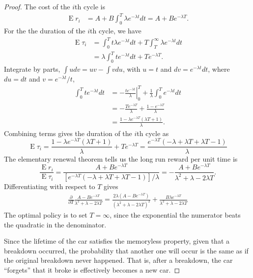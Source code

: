 \documentclass[oneside]{amsart}
\DeclareMathOperator{\E}{\mathrm{E}}
\theoremstyle{definition}
\begin{document}
\begin{proof}
The cost of the $i$th cycle is 
\begin{align*}
	\E r_i &= A + B  \int_0^T \lambda e^{-\lambda t} dt = A + B e^{-\lambda T}.
\end{align*}
For the the duration of the $i$th cycle, we have
\begin{align*}
	\E \tau_i &= \int_0^T t \lambda e^{-\lambda t}dt  + T \int_T^\infty \lambda e^{-\lambda t}dt \\
	&= \lambda \int_0^T t  e^{-\lambda t}dt +  T e^{-\lambda T}. 
\end{align*}
Integrate by parts, $\int  u  dv = uv- \int vdu$, with $u=t$ and $dv=e^{-\lambda t}dt$, where $du = dt$ and $v = e^{-\lambda t}/t$,
\begin{align*}
\int_0^T t e^{-\lambda t}dt  &= \left.-\frac{t e^{-\lambda t}}{\lambda} \right|_0^T + \frac{1}{\lambda} \int_0^Te^{-\lambda t}dt  \\ 
	&=-\frac{T e^{-\lambda T}}{\lambda} + \frac{1-e^{-\lambda T}}{\lambda} \\
	&= \frac{1-\lambda  e^{-\lambda T}(\lambda T + 1)}{\lambda}.
\end{align*}
Combining terms gives the duration of the $i$th cycle as
\[
	\E \tau_i =  \frac{1-\lambda  e^{-\lambda T}(\lambda T + 1)}{\lambda} +  T e^{-\lambda T} =\frac{e^{-\lambda T}(-\lambda  + \lambda T + \lambda T - 1)}{\lambda}
\]
The elementary renewal theorem tells us the long run reward per unit time is 
\[
	\frac{\E r_i}{\E \tau_i} = \frac{A + B e^{-\lambda T}}{[e^{-\lambda T}(-\lambda  + \lambda T + \lambda T - 1)]/\lambda} = -\frac{A + B e^{-\lambda T}}{\lambda^2  + \lambda - 2 \lambda T}.
\]
Differentiating with respect to $T$ gives 
\begin{align*}
	\frac{\partial}{\partial T}\frac{A - B e^{-\lambda T}}{\lambda^2  + \lambda - 2 \lambda T} 
	= \frac{2 \lambda(A - B e^{-\lambda T})}{(\lambda^2  + \lambda - 2 \lambda T)^2} + \frac{B \lambda e^{-\lambda T}}{\lambda^2  + \lambda - 2 \lambda T}
\end{align*}
The optimal policy is to set $T = \infty$, since the exponential the numerator beats the quadratic in the denominator. 
\par
Since the lifetime of the car satisfies the memoryless property, given that a breakdown occurred, the probability that another one will occur is the same as if the original breakdown never happened. That is, after a breakdown, the car ``forgets'' that it broke is effectively becomes a new car.
\end{proof}
\end{document}

